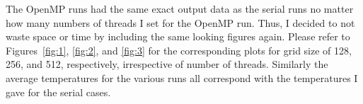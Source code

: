 \documentclass{article}
\begin{document}
The OpenMP runs had the same exact output data as the serial runs no matter how many numbers of threads I set for the OpenMP run.  Thus, I decided to not waste space or time by including the same looking figures again.  Please refer to Figures~\ref{fig:1}, \ref{fig:2}, and \ref{fig:3} for the corresponding plots for grid size of 128, 256, and 512, respectively, irrespective of number of threads.  Similarly the average temperatures for the various runs all correspond with the temperatures I gave for the serial cases.
\end{document}
